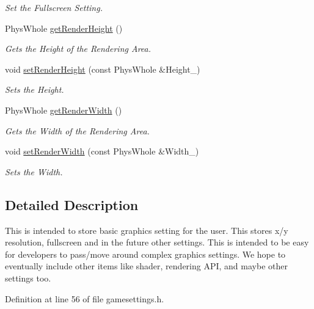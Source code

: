 \begin{DoxyCompactItemize}
\begin{DoxyCompactList}\small\item\em Set the Fullscreen Setting. \item\end{DoxyCompactList}\item 
PhysWhole \hyperlink{classGraphicsSettings_a099b5293b27204694bb3960ed713ad16}{getRenderHeight} ()
\begin{DoxyCompactList}\small\item\em Gets the Height of the Rendering Area. \item\end{DoxyCompactList}\item 
void \hyperlink{classGraphicsSettings_a41ada52f49dba3c45ac1d6c279278846}{setRenderHeight} (const PhysWhole \&Height\_\-)
\begin{DoxyCompactList}\small\item\em Sets the Height. \item\end{DoxyCompactList}\item 
PhysWhole \hyperlink{classGraphicsSettings_a86008870caa145cab66ab6f97baa8113}{getRenderWidth} ()
\begin{DoxyCompactList}\small\item\em Gets the Width of the Rendering Area. \item\end{DoxyCompactList}\item 
void \hyperlink{classGraphicsSettings_a67fa224f5904030ccc24e711d1752f62}{setRenderWidth} (const PhysWhole \&Width\_\-)
\begin{DoxyCompactList}\small\item\em Sets the Width. \item\end{DoxyCompactList}\end{DoxyCompactItemize}


\subsection{Detailed Description}
This is intended to store basic graphics setting for the user. This stores x/y resolution, fullscreen and in the future other settings. This is intended to be easy for developers to pass/move around complex graphics settings. We hope to eventually include other items like shader, rendering API, and maybe other settings too. 

Definition at line 56 of file gamesettings.h.

